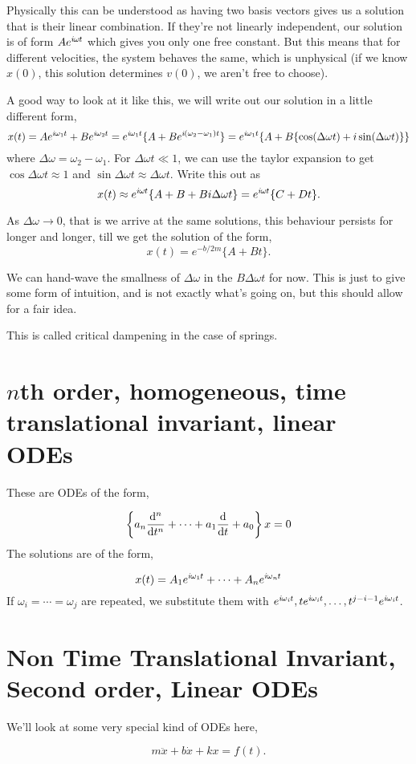 Physically this can be understood as having two basis vectors gives us a solution that is their linear combination. If they’re not linearly independent, our solution is of form $Ae^{i\hspace{-0.05em}\omega\hspace{-0.05em} t}$ which gives you only one free constant. But this means that for different velocities, the system behaves the same, which is unphysical (if we know $x(0)$, this solution determines $v(0)$, we aren’t free to choose).

A good way to look at it like this, we will write out our solution in a little different form,
$$
x(t) = Ae^{i\hspace{-0.05em}\omega_{1}\hspace{-0.05em} t} + Be^{i\hspace{-0.05em}\omega_{2}\hspace{-0.05em} t} = e^{i\hspace{-0.05em}\omega_{1}\hspace{-0.05em} t}\{A + Be^{i\hspace{-0.05em}(\omega_{2} - \omega_{1})t}\} = e^{i\hspace{-0.05em}\omega_{1}\hspace{-0.05em} t}\{A + B\{\cos (\Delta \omega t) + i\sin(\Delta \omega t)\}\}
$$
where $\Delta \omega = \omega_{2} - \omega_{1}$. For $\Delta\omega t \ll 1$, we can use the taylor expansion to get $\cos\Delta \omega t \approx {1}$ and $\sin\Delta \omega t \approx \Delta \omega t$. Write this out as
$$x(t) \approx e^{i\hspace{-0.05em}\omega\hspace{-0.05em} t}\{A + B + Bi\Delta \omega t\} = e^{i\hspace{-0.05em}\omega\hspace{-0.05em} t}\{C + Dt\}.$$

As $\Delta \omega \to 0$, that is we arrive at the same solutions, this behaviour persists for longer and longer, till we get the solution of the form,
$$
x(t) = e^{-b/2m} \{A + Bt\}.
$$

We can hand-wave the smallness of $\Delta \omega$ in the $B \Delta \omega t$ for now. This is just to give some form of intuition, and is not exactly what’s going on, but this should allow for a fair idea.

This is called critical dampening in the case of springs.

\section{$n$th order, homogeneous, time translational invariant, linear ODEs}

These are ODEs of the form,

$$
\left\{a_{n}\dv[n]{}{t} + \cdots + a_{1}\dv{}{t} + a_{0}\right\}x = 0
$$
The solutions are of the form,

$$
x(t) = A_{1}e^{i\hspace{-0.05em}\omega_{1}\hspace{-0.05em} t} + \cdots + A_{n}e^{i\hspace{-0.05em}\omega_{n}\hspace{-0.05em} t}
$$
If $\omega_{i} = \cdots = \omega_{j}$ are repeated, we substitute them with $e^{i\hspace{-0.05em}\omega_{i}\hspace{-0.05em} t}, te^{i\hspace{-0.05em}\omega_{i}\hspace{-0.05em} t}, \dots, t^{j-i -1}e^{i\hspace{-0.05em}\omega_{i}\hspace{-0.05em} t}$.

\section{Non Time Translational Invariant, Second order, Linear ODEs}

We’ll look at some very special kind of ODEs here,

$$
m \ddot{x} + b \dot{x} + kx = f(t).
$$